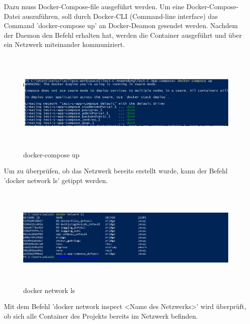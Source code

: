\documentclass[a4paper,12pt,oneside]{book}
\begin{document}
Dazu muss Docker-Compose-file ausgeführt werden. Um eine Docker-Compose-Datei auszuführen, soll durch Docker-CLI (Command-line interface) das Command 'docker-compose up' an Docker-Deamon gesendet werden.
\newline
Nachdem der Daemon den Befehl erhalten hat, werden die Container ausgeführt und über ein Netzwerk miteinander kommuniziert.
\begin{figure}[h!]
	\begin{center}
		\includegraphics[width=17cm, height=5cm]{composeUp.PNG}
		\caption{docker-compose up} 
		\label{docker-compose up} 
	\end{center}
\end{figure}
\newline
Um zu überprüfen, ob das Netzwerk bereits erstellt wurde, kann der Befehl 'docker network ls' getippt werden.
\newpage
\begin{figure}[h!]
	\begin{center}
		\includegraphics[width=17cm, height=5cm]{docker-network-ls.PNG}
		\caption{docker network ls} 
		\label{docker network ls} 
	\end{center}
\end{figure}
Mit dem Befehl 'docker network inspect <Name des Netzwerks>' wird überprüft, ob sich alle Container des Projekts bereits im Netzwerk befinden.
\end{document}
